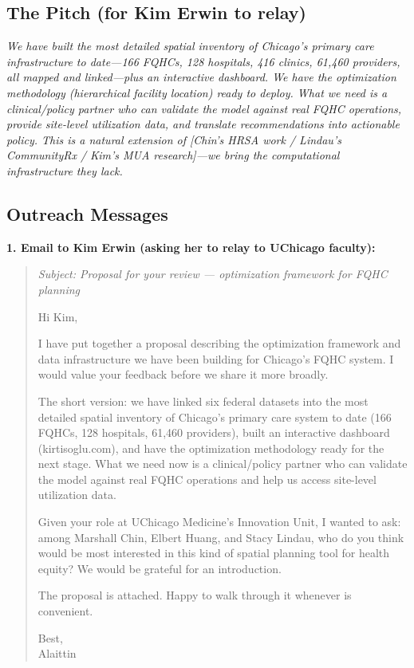 \documentclass[11pt]{article}
\begin{document}
\subsection*{The Pitch (for Kim Erwin to relay)}

\textit{We have built the most detailed spatial inventory of Chicago's primary care infrastructure to date---166 FQHCs, 128 hospitals, 416 clinics, 61,460 providers, all mapped and linked---plus an interactive dashboard. We have the optimization methodology (hierarchical facility location) ready to deploy. What we need is a clinical/policy partner who can validate the model against real FQHC operations, provide site-level utilization data, and translate recommendations into actionable policy. This is a natural extension of [Chin's HRSA work / Lindau's CommunityRx / Kim's MUA research]---we bring the computational infrastructure they lack.}

\subsection*{Outreach Messages}

\textbf{1. Email to Kim Erwin (asking her to relay to UChicago faculty):}

\begin{quote}
\textit{Subject: Proposal for your review --- optimization framework for FQHC planning}

Hi Kim,

I have put together a proposal describing the optimization framework and data infrastructure we have been building for Chicago's FQHC system. I would value your feedback before we share it more broadly.

The short version: we have linked six federal datasets into the most detailed spatial inventory of Chicago's primary care system to date (166 FQHCs, 128 hospitals, 61,460 providers), built an interactive dashboard (kirtisoglu.com), and have the optimization methodology ready for the next stage. What we need now is a clinical/policy partner who can validate the model against real FQHC operations and help us access site-level utilization data.

Given your role at UChicago Medicine's Innovation Unit, I wanted to ask: among Marshall Chin, Elbert Huang, and Stacy Lindau, who do you think would be most interested in this kind of spatial planning tool for health equity? We would be grateful for an introduction.

The proposal is attached. Happy to walk through it whenever is convenient.

Best,\\
Alaittin
\end{quote}
\end{document}
